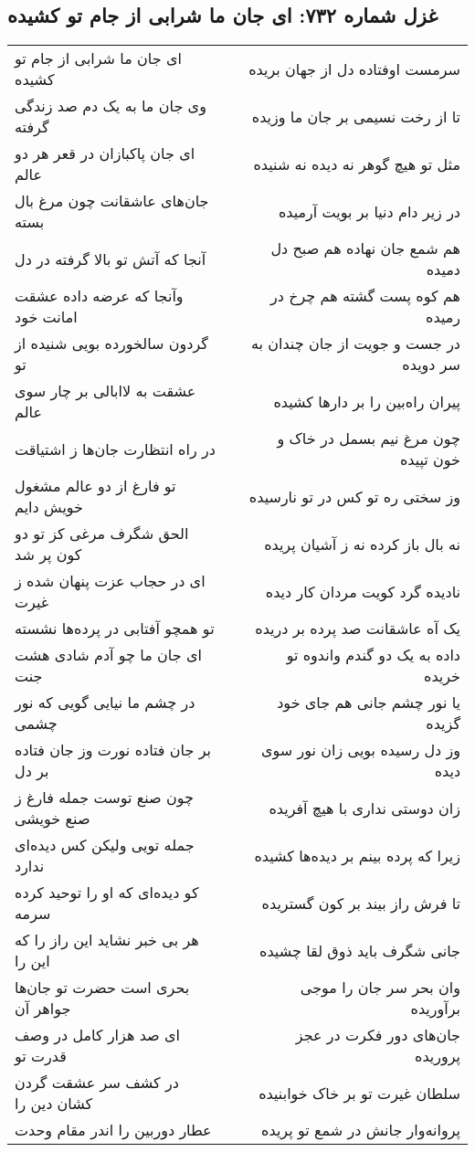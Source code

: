 \begin{center}
\section*{غزل شماره ۷۳۲: ای جان ما شرابی از جام تو کشیده}
\label{sec:732}
\begin{longtable}{l p{0.5cm} r}
ای جان ما شرابی از جام تو کشیده
&&
سرمست اوفتاده دل از جهان بریده
\\
وی جان ما به یک دم صد زندگی گرفته
&&
تا از رخت نسیمی بر جان ما وزیده
\\
ای جان پاکبازان در قعر هر دو عالم
&&
مثل تو هیچ گوهر نه دیده نه شنیده
\\
جان‌های عاشقانت چون مرغ بال بسته
&&
در زیر دام دنیا بر بویت آرمیده
\\
آنجا که آتش تو بالا گرفته در دل
&&
هم شمع جان نهاده هم صبح دل دمیده
\\
وآنجا که عرضه داده عشقت امانت خود
&&
هم کوه پست گشته هم چرخ در رمیده
\\
گردون سالخورده بویی شنیده از تو
&&
در جست و جویت از جان چندان به سر دویده
\\
عشقت به لاابالی بر چار سوی عالم
&&
پیران راه‌بین را بر دارها کشیده
\\
در راه انتظارت جان‌ها ز اشتیاقت
&&
چون مرغ نیم بسمل در خاک و خون تپیده
\\
تو فارغ از دو عالم مشغول خویش دایم
&&
وز سختی ره تو کس در تو نارسیده
\\
الحق شگرف مرغی کز تو دو کون پر شد
&&
نه بال باز کرده نه ز آشیان پریده
\\
ای در حجاب عزت پنهان شده ز غیرت
&&
نادیده گرد کویت مردان کار دیده
\\
تو همچو آفتابی در پرده‌ها نشسته
&&
یک آه عاشقانت صد پرده بر دریده
\\
ای جان ما چو آدم شادی هشت جنت
&&
داده به یک دو گندم واندوه تو خریده
\\
در چشم ما نیایی گویی که نور چشمی
&&
یا نور چشم جانی هم جای خود گزیده
\\
بر جان فتاده نورت وز جان فتاده بر دل
&&
وز دل رسیده بویی زان نور سوی دیده
\\
چون صنع توست جمله فارغ ز صنع خویشی
&&
زان دوستی نداری با هیچ آفریده
\\
جمله تویی ولیکن کس دیده‌ای ندارد
&&
زیرا که پرده بینم بر دیده‌ها کشیده
\\
کو دیده‌ای که او را توحید کرده سرمه
&&
تا فرش راز بیند بر کون گستریده
\\
هر بی خبر نشاید این راز را که این را
&&
جانی شگرف باید ذوق لقا چشیده
\\
بحری است حضرت تو جان‌ها جواهر آن
&&
وان بحر سر جان را موجی برآوریده
\\
ای صد هزار کامل در وصف قدرت تو
&&
جان‌های دور فکرت در عجز پروریده
\\
در کشف سر عشقت گردن کشان دین را
&&
سلطان غیرت تو بر خاک خوابنیده
\\
عطار دوربین را اندر مقام وحدت
&&
پروانه‌وار جانش در شمع تو پریده
\\
\end{longtable}
\end{center}
